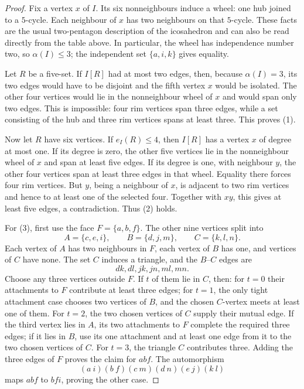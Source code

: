 \documentclass[11pt]{article}
\theoremstyle{definition}
\theoremstyle{remark}
\begin{document}
\begin{proof}
Fix a vertex $x$ of $I$.  Its six nonneighbours induce a wheel: one hub
joined to a $5$-cycle.  Each neighbour of $x$ has two neighbours on that
$5$-cycle.  These facts are the usual two-pentagon description of the
icosahedron and can also be read directly from the table above.  In
particular, the wheel has independence number two, so $\alpha(I)\le3$;
the independent set $\{a,i,k\}$ gives equality.

Let $R$ be a five-set.  If $I[R]$ had at most two edges, then, because
$\alpha(I)=3$, its two edges would have to be disjoint and the fifth vertex
$x$ would be isolated.  The other four vertices would lie in the
nonneighbour wheel of $x$ and would span only two edges.  This is impossible:
four rim vertices span three edges, while a set consisting of the hub and
three rim vertices spans at least three.  This proves (1).

Now let $R$ have six vertices.  If $e_I(R)\le4$, then $I[R]$ has a vertex
$x$ of degree at most one.  If its degree is zero, the other five vertices
lie in the nonneighbour wheel of $x$ and span at least five edges.  If its
degree is one, with neighbour $y$, the other four vertices span at least
three edges in that wheel.  Equality there forces four rim vertices.  But
$y$, being a neighbour of $x$, is adjacent to two rim vertices and hence to
at least one of the selected four.  Together with $xy$, this gives at least
five edges, a contradiction.  Thus (2) holds.

For (3), first use the face $F=\{a,b,f\}$.  The other nine vertices split
into
\[
 A=\{c,e,i\},\qquad B=\{d,j,m\},\qquad C=\{k,l,n\}.
\]
Each vertex of $A$ has two neighbours in $F$, each vertex of $B$ has one,
and vertices of $C$ have none.  The set $C$ induces a triangle, and the
$B$--$C$ edges are
\[
 dk,dl,jk,jn,ml,mn.
\]
Choose any three vertices outside $F$.  If $t$ of them lie in $C$, then:
for $t=0$ their attachments to $F$ contribute at least three edges; for
 $t=1$, the only tight attachment case chooses two vertices of $B$, and the
 chosen $C$-vertex meets at least one of them.  For $t=2$, the two chosen
 vertices of $C$ supply their mutual edge.  If the third vertex lies in $A$,
 its two attachments to $F$ complete the required three edges; if it lies in
 $B$, use its one attachment and at least one edge from it to the two chosen
 vertices of $C$.  For $t=3$, the triangle $C$ contributes three.  Adding the
 three edges of $F$ proves the claim for $abf$.  The automorphism
\[
 (a\ i)(b\ f)(c\ m)(d\ n)(e\ j)(k\ l)
\]
maps $abf$ to $bfi$, proving the other case.
\end{proof}
\end{document}
